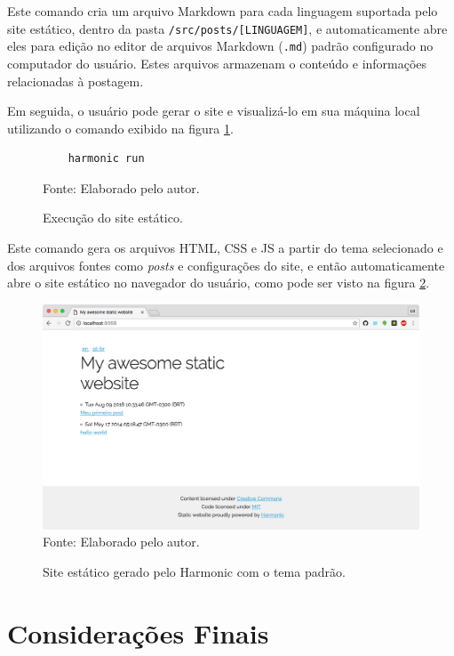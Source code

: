\documentclass[ppginf, pep]{esinucpel}
\newcommand{\code}[1]{\texttt{#1}}
\begin{document}
Este comando cria um arquivo Markdown para cada linguagem suportada pelo site estático, dentro da pasta \code{/src/posts/[LINGUAGEM]}, e automaticamente abre eles para edição no editor de arquivos Markdown (\code{.md}) padrão configurado no computador do usuário. Estes arquivos armazenam o conteúdo e informações relacionadas à postagem.

Em seguida, o usuário pode gerar o site e visualizá-lo em sua máquina local utilizando o comando exibido na figura \ref{fig:comando_harmonic_run}.

\begin{figure}[H]
    \centering
    \caption{Execução do site estático.}
    \vspace{5pt}
    \lstset{language=sh}
    \begin{lstlisting}
    harmonic run
    \end{lstlisting}
    Fonte: Elaborado pelo autor.
    \label{fig:comando_harmonic_run}
\end{figure}

Este comando gera os arquivos HTML, CSS e JS a partir do tema selecionado e dos arquivos fontes como \textit{posts} e configurações do site, e então automaticamente abre o site estático no navegador do usuário, como pode ser visto na figura \ref{fig:harmonic_site_default}.

\begin{figure}[H]
    \centering
    \caption{Site estático gerado pelo Harmonic com o tema padrão.}
    \vspace{5pt}
    \includegraphics[width=\textwidth]{harmonic_site_default}
    Fonte: Elaborado pelo autor.
    \label{fig:harmonic_site_default}
\end{figure}

\chapter{Considerações Finais}
\end{document}
